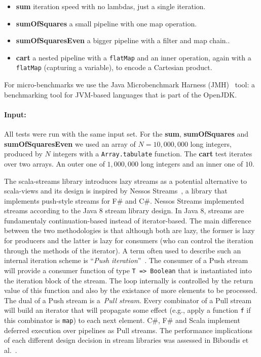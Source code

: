 \begin{itemize}
 \item \textbf{sum} iteration speed with no lambdas, just a single iteration.
 \item \textbf{sumOfSquares} a small pipeline with one map operation.
 \item \textbf{sumOfSquaresEven} a bigger pipeline with a filter and map chain..
 \item \textbf{cart} a nested pipeline with a \verb|flatMap| and an inner
   operation, again with a \verb|flatMap| (capturing a variable), to encode a
   Cartesian product.
\end{itemize}

For micro-benchmarks we use the Java Microbenchmark Harness
(JMH)~\cite{aleksey_shipilev_openjdk:_????} tool: a benchmarking tool for
JVM-based languages that is part of the OpenJDK.

\paragraph{Input:} All tests were run with the same input set. For the
\textbf{sum}, \textbf{sumOfSquares} and \textbf{sumOfSquaresEven} we used an
array of $N = 10,000,000$ long integers, produced by $N$ integers with a
\verb|Array.tabulate| function. The \textbf{cart} test iterates over two
arrays. An outer one of $1,000,000$ long integers and an inner one of $10$.

The scala-streams library introduces lazy streams as a potential alternative to
scala-views and its design is inspired by Nessos Streams~\cite{nessos_streams},
a library that implements push-style streams for F\# and C\#. Nessos Streams
implemented streams according to the Java 8 stream library design. In Java 8,
streams are fundamentaly continuation-based instead of iterator-based. The main
difference between the two methodologies is that although both are lazy, the
former is lazy for producers and the latter is lazy for consumers (who can
control the iteration through the methods of the iterator). A term often used to
describe such an internal iteration scheme is ``\emph{Push
  iteration}''~\cite{obsidian,defuncpush}.  The consumer of a Push stream will
provide a consumer function of type \verb|T => Boolean| that is instantiated
into the iteration block of the stream. The loop internally is controlled by the
return value of this function and also by the existance of more elements to be
processed. The dual of a Push stream is a~\emph{Pull stream}. Every combinator
of a Pull stream will build an iterator that will propagate some effect (e.g.,
apply a function \verb|f| if this combinator is \verb|map|) to each next
element. C\#, F\# and Scala implement deferred execution over pipelines as Pull
streams. The performance implications of each different design decision in
stream libraries was assessed in Biboudis et al.~\cite{biboudis_clash_2014}.

